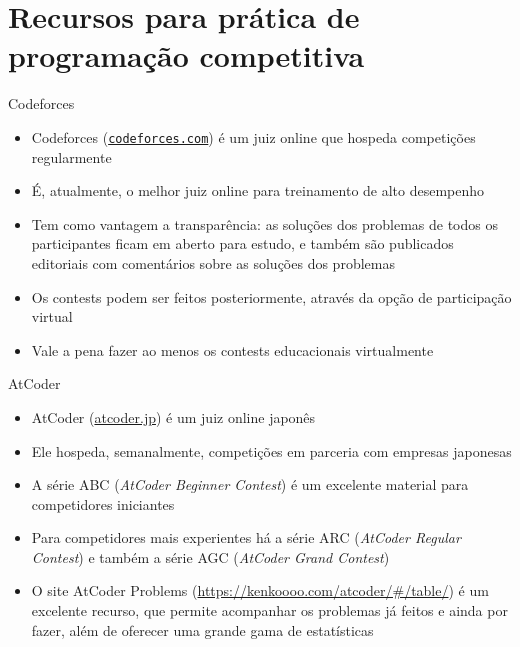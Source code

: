 \section{Recursos para prática de programação competitiva}

\begin{frame}[fragile]{Codeforces}

    \begin{itemize}
        \item Codeforces (\texttt{\url{codeforces.com}}) é um juiz online que hospeda competições
            regularmente

        \item É, atualmente, o melhor juiz online para treinamento de alto desempenho

        \item Tem como vantagem a transparência: as soluções dos problemas de todos os
            participantes ficam em aberto para estudo, e também são publicados editoriais
            com comentários sobre as soluções dos problemas

        \item Os contests podem ser feitos posteriormente, através da opção de participação
            virtual

        \item Vale a pena fazer ao menos os contests educacionais virtualmente

    \end{itemize}

\end{frame}

\begin{frame}[fragile]{AtCoder}

    \begin{itemize}
        \item AtCoder (\url{atcoder.jp}) é um juiz online japonês

        \item Ele hospeda, semanalmente, competições em parceria com empresas japonesas

        \item A série ABC (\textit{AtCoder Beginner Contest}) é um excelente material para competidores
            iniciantes

        \item Para competidores mais experientes há a série ARC (\textit{AtCoder Regular Contest}) e 
            também a série AGC (\textit{AtCoder Grand Contest})

        \item O site AtCoder Problems (\url{https://kenkoooo.com/atcoder/#/table/}) é um excelente
            recurso, que permite acompanhar os problemas já feitos e ainda por fazer, além de oferecer
            uma grande gama de estatísticas
     \end{itemize}

\end{frame}

